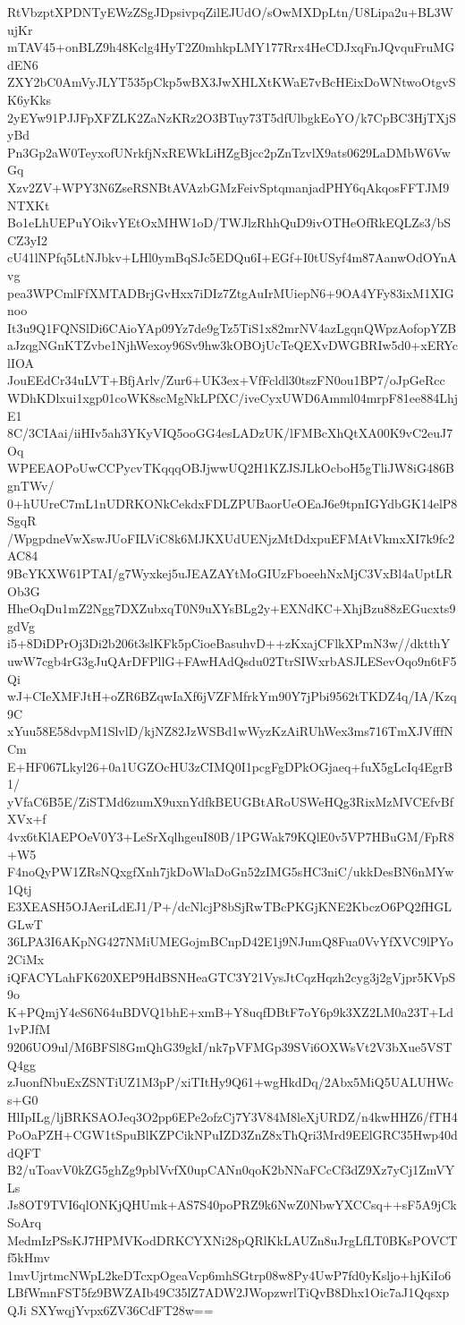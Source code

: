 RtVbzptXPDNTyEWzZSgJDpsivpqZilEJUdO/sOwMXDpLtn/U8Lipa2u+BL3WujKr
mTAV45+onBLZ9h48Kclg4HyT2Z0mhkpLMY177Rrx4HeCDJxqFnJQvquFruMGdEN6
ZXY2bC0AmVyJLYT535pCkp5wBX3JwXHLXtKWaE7vBcHEixDoWNtwoOtgvSK6yKks
2yEYw91PJJFpXFZLK2ZaNzKRz2O3BTuy73T5dfUlbgkEoYO/k7CpBC3HjTXjSyBd
Pn3Gp2aW0TeyxofUNrkfjNxREWkLiHZgBjcc2pZnTzvlX9ats0629LaDMbW6VwGq
Xzv2ZV+WPY3N6ZseRSNBtAVAzbGMzFeivSptqmanjadPHY6qAkqosFFTJM9NTXKt
Bo1eLhUEPuYOikvYEtOxMHW1oD/TWJlzRhhQuD9ivOTHeOfRkEQLZs3/bSCZ3yI2
cU41lNPfq5LtNJbkv+LHl0ymBqSJc5EDQu6I+EGf+I0tUSyf4m87AanwOdOYnAvg
pea3WPCmlFfXMTADBrjGvHxx7iDIz7ZtgAuIrMUiepN6+9OA4YFy83ixM1XIGnoo
It3u9Q1FQNSlDi6CAioYAp09Yz7de9gTz5TiS1x82mrNV4azLgqnQWpzAofopYZB
aJzqgNGnKTZvbe1NjhWexoy96Sv9hw3kOBOjUcTeQEXvDWGBRIw5d0+xERYclIOA
JouEEdCr34uLVT+BfjArlv/Zur6+UK3ex+VfFcldl30tszFN0ou1BP7/oJpGeRcc
WDhKDlxui1xgp01coWK8scMgNkLPfXC/iveCyxUWD6Amml04mrpF81ee884LhjE1
8C/3CIAai/iiHIv5ah3YKyVIQ5ooGG4esLADzUK/lFMBcXhQtXA00K9vC2euJ7Oq
WPEEAOPoUwCCPycvTKqqqOBJjwwUQ2H1KZJSJLkOcboH5gTliJW8iG486BgnTWv/
0+hUUreC7mL1nUDRKONkCekdxFDLZPUBaorUeOEaJ6e9tpnIGYdbGK14elP8SgqR
/WpgpdneVwXswJUoFILViC8k6MJKXUdUENjzMtDdxpuEFMAtVkmxXI7k9fc2AC84
9BcYKXW61PTAI/g7Wyxkej5uJEAZAYtMoGIUzFboeehNxMjC3VxBl4aUptLROb3G
HheOqDu1mZ2Ngg7DXZubxqT0N9uXYsBLg2y+EXNdKC+XhjBzu88zEGucxts9gdVg
i5+8DiDPrOj3Di2b206t3slKFk5pCioeBasuhvD++zKxajCFlkXPmN3w//dktthY
uwW7cgb4rG3gJuQArDFPllG+FAwHAdQsdu02TtrSIWxrbASJLESevOqo9n6tF5Qi
wJ+CIeXMFJtH+oZR6BZqwIaXf6jVZFMfrkYm90Y7jPbi9562tTKDZ4q/IA/Kzq9C
xYuu58E58dvpM1SlvlD/kjNZ82JzWSBd1wWyzKzAiRUhWex3ms716TmXJVfffNCm
E+HF067Lkyl26+0a1UGZOcHU3zCIMQ0I1pcgFgDPkOGjaeq+fuX5gLcIq4EgrB1/
yVfaC6B5E/ZiSTMd6zumX9uxnYdfkBEUGBtARoUSWeHQg3RixMzMVCEfvBfXVx+f
4vx6tKlAEPOeV0Y3+LeSrXqlhgeuI80B/1PGWak79KQlE0v5VP7HBuGM/FpR8+W5
F4noQyPW1ZRsNQxgfXnh7jkDoWlaDoGn52zIMG5sHC3niC/ukkDesBN6nMYw1Qtj
E3XEASH5OJAeriLdEJ1/P+/dcNlcjP8bSjRwTBcPKGjKNE2KbczO6PQ2fHGLGLwT
36LPA3I6AKpNG427NMiUMEGojmBCnpD42E1j9NJumQ8Fua0VvYfXVC9lPYo2CiMx
iQFACYLahFK620XEP9HdBSNHeaGTC3Y21VysJtCqzHqzh2cyg3j2gVjpr5KVpS9o
K+PQmjY4eS6N64uBDVQ1bhE+xmB+Y8uqfDBtF7oY6p9k3XZ2LM0a23T+Ld1vPJfM
9206UO9ul/M6BFSl8GmQhG39gkI/nk7pVFMGp39SVi6OXWsVt2V3bXue5VSTQ4gg
zJuonfNbuExZSNTiUZ1M3pP/xiTItHy9Q61+wgHkdDq/2Abx5MiQ5UALUHWcs+G0
HlIpILg/ljBRKSAOJeq3O2pp6EPe2ofzCj7Y3V84M8leXjURDZ/n4kwHHZ6/fTH4
PoOaPZH+CGW1tSpuBlKZPCikNPuIZD3ZnZ8xThQri3Mrd9EElGRC35Hwp40ddQFT
B2/uToavV0kZG5ghZg9pblVvfX0upCANn0qoK2bNNaFCcCf3dZ9Xz7yCj1ZmVYLs
Js8OT9TVI6qlONKjQHUmk+AS7S40poPRZ9k6NwZ0NbwYXCCsq++sF5A9jCkSoArq
MedmIzPSsKJ7HPMVKodDRKCYXNi28pQRlKkLAUZn8uJrgLfLT0BKsPOVCTf5kHmv
1mvUjrtmcNWpL2keDTcxpOgeaVcp6mhSGtrp08w8Py4UwP7fd0yKsljo+hjKiIo6
LBfWmnFST5fz9BWZAIb49C35lZ7ADW2JWopzwrlTiQvB8Dhx1Oic7aJ1QqsxpQJi
SXYwqjYvpx6ZV36CdFT28w==
